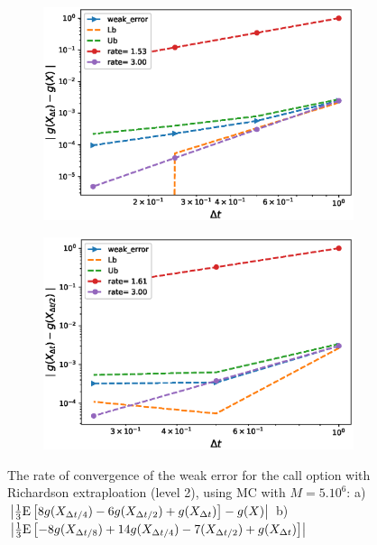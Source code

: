 \documentclass[11pt]{article}
\newcommand{\expt}[1]{\mathrm{E}\left[#1\right]}
\begin{document}
\begin{figure}[h!]
	\centering
	\begin{subfigure}{.4\textwidth}
		\centering
		\includegraphics[width=1\linewidth]{./figures/weak_error_rates_call/Beta_32/with_rich/weak_convergence_order_Call_richardson_level2_relative_M_5_10_6}
		\caption{}
		\label{fig:sub3}
	\end{subfigure}%
	\begin{subfigure}{.4\textwidth}
		\centering
		\includegraphics[width=1\linewidth]{./figures/weak_error_rates_call/Beta_32/with_rich/weak_convergence_order_differences_Call_richardson_level2_relative_M_5_10_6}
		\caption{}
		\label{fig:sub4}
	\end{subfigure}
	
	\caption{The rate of convergence of the weak error for the  call option with Richardson extraploation (level 2), using MC with $M=5.10^6$: a) $\abs{\frac{1}{3}\expt{8 g(X_{\Delta t/4}) -6g(X_{\Delta t/2}) +g(X_{\Delta t})}-g(X)}$  b) $\abs{\frac{1}{3}\expt{-8 g(X_{\Delta t/8}) +14g(X_{\Delta t/4})-7 (X_{\Delta t/2}) +g(X_{\Delta t})}}$}
	\label{fig:Weak_rate_call_with_rich_level2_beta_32}
\end{figure}
\end{document}
